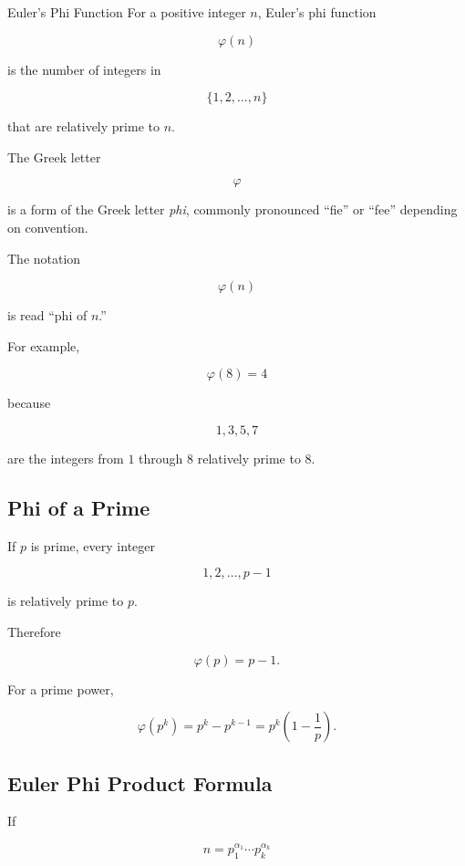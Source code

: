\begin{definitionbox}{Euler's Phi Function}
For a positive integer \(n\), Euler's phi function

\[ \varphi(n) \]

is the number of integers in

\[ \{1,2,\ldots,n\} \]

that are relatively prime to \(n\).
\end{definitionbox}

The Greek letter

\[ \varphi \]

is a form of the Greek letter \emph{phi}, commonly pronounced ``fie'' or
``fee'' depending on convention.

The notation

\[ \varphi(n) \]

is read ``phi of \(n\).''

For example,

\[ \varphi(8)=4 \]

because

\[ 1,3,5,7 \]

are the integers from \(1\) through \(8\) relatively prime to \(8\).

\subsection{Phi of a Prime}
\label{subsec:phi-prime}

If \(p\) is prime, every integer

\[ 1,2,\ldots,p-1 \]

is relatively prime to \(p\).

Therefore

\[ \boxed{\varphi(p)=p-1.} \]

For a prime power,

\[ \boxed{\varphi(p^k)=p^k-p^{k-1}=p^k\left(1-\frac1p\right).} \]

\subsection{Euler Phi Product Formula}
\label{subsec:phi-product-formula}

If

\[ n=p_1^{\alpha_1}\cdots p_k^{\alpha_k} \]


